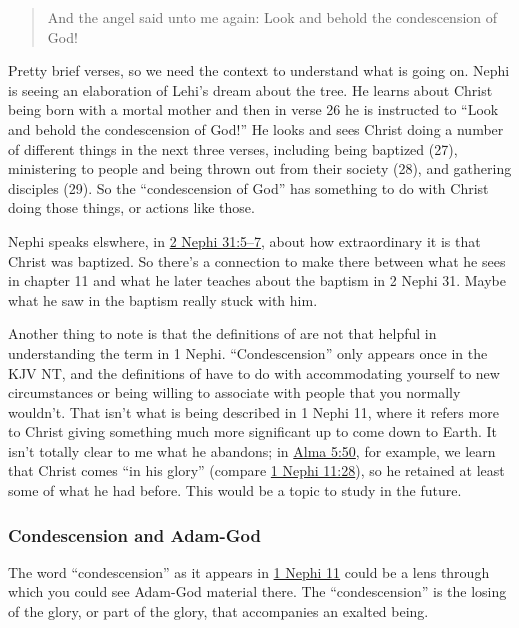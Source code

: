 		\begin{quote}
			And the angel said unto me again: Look and behold the condescension of God!
		\end{quote}
		
		Pretty brief verses, so we need the context to understand what is going on. Nephi is seeing an elaboration of Lehi's dream about the tree. He learns about Christ being born with a mortal mother and then in verse 26 he is instructed to ``Look and behold the condescension of God!'' He looks and sees Christ doing a number of different things in the next three verses, including being baptized (27), ministering to people and being thrown out from their society (28), and gathering disciples (29). So the ``condescension of God'' has something to do with Christ doing those things, or actions like those.
		
		Nephi speaks elswhere, in \hyperref[2NEPHI-31-5]{2 Nephi 31:5--7}, about how extraordinary it is that Christ was baptized. So there's a connection to make there between what he sees in chapter 11 and what he later teaches about the baptism in 2 Nephi 31. Maybe what he saw in the baptism really stuck with him.
		
		Another thing to note is that the definitions of \hyperref[SUNAPAGO]{} are not that helpful in understanding the term in 1 Nephi. ``Condescension'' only appears once in the KJV NT, and the definitions of  have to do with accommodating yourself to new circumstances or being willing to associate with people that you normally wouldn't. That isn't what is being described in 1 Nephi 11, where it refers more to Christ giving something much more significant up to come down to Earth. It isn't totally clear to me what he abandons; in \hyperref[ALMA-5-50]{Alma 5:50}, for example, we learn that Christ comes ``in his glory'' (compare \hyperref[1NEPHI-11-28]{1 Nephi 11:28}), so he retained at least some of what he had before. This would be a topic to study in the future.
			
	\subsubsection{Condescension and Adam-God}
		\label{CONDESCENSION-adamgod}
		
		The word ``condescension'' as it appears in \hyperref[1NEPHI-11]{1 Nephi 11} could be a lens through which you could see Adam-God material there. The ``condescension'' is the losing of the glory, or part of the glory, that accompanies an exalted being. 